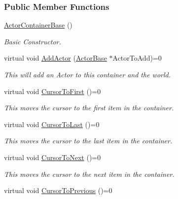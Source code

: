 \subsubsection*{Public Member Functions}
\begin{DoxyCompactItemize}
\item 
\hyperlink{classphys_1_1ActorContainerBase_ac17a442ad8aacba14d1cef956c0ddbb8}{ActorContainerBase} ()
\begin{DoxyCompactList}\small\item\em Basic Constructor. \item\end{DoxyCompactList}\item 
virtual void \hyperlink{classphys_1_1ActorContainerBase_a8dd213cba4915f68ac421fc9f341cbbe}{AddActor} (\hyperlink{classphys_1_1ActorBase}{ActorBase} $\ast$ActorToAdd)=0
\begin{DoxyCompactList}\small\item\em This will add an Actor to this container and the world. \item\end{DoxyCompactList}\item 
virtual void \hyperlink{classphys_1_1ActorContainerBase_ab1a44758d7c17e70ff2e0f8de47424c3}{CursorToFirst} ()=0
\begin{DoxyCompactList}\small\item\em This moves the cursor to the first item in the container. \item\end{DoxyCompactList}\item 
virtual void \hyperlink{classphys_1_1ActorContainerBase_afad072e018a04c190e5e5fb93b82b354}{CursorToLast} ()=0
\begin{DoxyCompactList}\small\item\em This moves the cursor to the last item in the container. \item\end{DoxyCompactList}\item 
virtual void \hyperlink{classphys_1_1ActorContainerBase_a1aa337456a4e74cb5740dbae08778072}{CursorToNext} ()=0
\begin{DoxyCompactList}\small\item\em This moves the cursor to the next item in the container. \item\end{DoxyCompactList}\item 
virtual void \hyperlink{classphys_1_1ActorContainerBase_a7c424168c0bbd973b283a083714123b3}{CursorToPrevious} ()=0

\end{DoxyCompactItemize}
